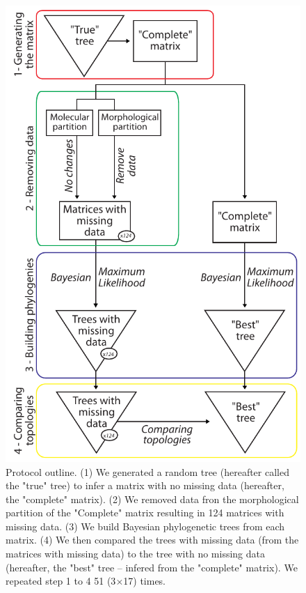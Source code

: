 \documentclass[12pt,letterpaper]{article}
\begin{document}
\begin{figure}
\centering
\includegraphics[keepaspectratio=true]{Figures/TEM_Fig_outline.pdf}
\caption{Protocol outline.
(1) We generated a random tree (hereafter called the "true" tree) to infer a matrix with no missing data (hereafter, the "complete" matrix).
(2) We removed data fron the morphological partition of the "Complete" matrix resulting in 124 matrices with missing data.
(3) We build Bayesian phylogenetic trees from each matrix.
(4) We then compared the trees with missing data (from the matrices with missing data) to the tree with no missing data (hereafter, the "best" tree – infered from the "complete" matrix).
We repeated step 1 to 4 51 (3$\times $17) times.}
\label{Fig_Outline}
\end{figure}
\end{document}
